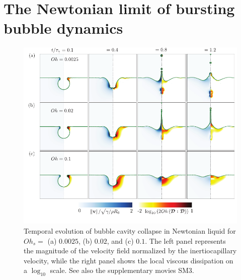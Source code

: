 \documentclass{jfm}
\newcommand{\AKD}[1]{{\textcolor{black}{#1}}}
\begin{document}
\appendix

\section{The Newtonian limit of bursting bubble dynamics}
\label{app:newtonian_limit}
\renewcommand{\thefigure}{\Alph{section}\,\arabic{figure}}
\setcounter{figure}{0}

\begin{figure}
	\includegraphics[width=\textwidth]{Facets_time_Oh_Newt_05-eps-converted-to.pdf}
	\caption{Temporal evolution of bubble cavity collapse in Newtonian liquid for $Oh_s =$ (a) $0.0025$, (b) $0.02$\AKD{,} and (c) $0.1$. The left panel represents the magnitude of the velocity field normalized by the inertiocapillary velocity, while the right panel shows the local viscous dissipation on a $\log_{10}$ scale. See also the supplementary movies SM3.}
	\label{facets_time_Oh_Newt}
\end{figure}
\end{document}
